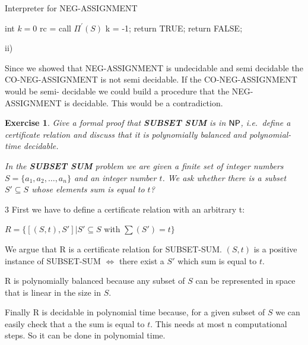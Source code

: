 \documentclass [11pt]{article}
\newtheorem{exercise}[theorem]{Exercise}
\newcommand{\ccfont}[1]{\protect\mathsf{#1}}
\newcommand{\NP}{\ccfont{NP}}
\newcommand{\solution}[1]{\noindent {\bf Solution.}  #1}
\begin{document}
\begin{algorithm}
\caption{Interpreter for NEG-ASSIGNMENT }
\label{intNEG}
\begin{algorithmic}

 \State int $k = 0$
 \State rc = call $\Pi^\prime(S)$
 \State k = -1;
  \State return TRUE;
 \Else
 \State return FALSE;
 \EndIf
\EndFunction

\end{algorithmic}
\end{algorithm}

\solution ii)

Since we showed that NEG-ASSIGNMENT is undecidable and semi decidable the CO-NEG-ASSIGNMENT is not semi decidable. If the CO-NEG-ASSIGNMENT would be semi- decidable we could build a procedure that the NEG-ASSIGNMENT is decidable. This would be a contradiction.

\begin{exercise}
  Give a formal proof that \textbf{SUBSET SUM} is in $\NP$, i.e.\, define a
  certificate relation and discuss that it is polynomially balanced and
  polynomial-time decidable.
  
   \smallskip
    
  \noindent In the \textbf{SUBSET SUM} problem we are given a finite set of integer numbers $S=\{a_1, a_2, \ldots, a_n\}$ and an integer number $t$. We ask whether there is a subset $S'\subseteq S$ whose elements sum is equal to $t$?
  
\end{exercise}


\solution{ 3}
   \smallskip
First we have to define a certificate relation with an arbitrary t:

\bigskip

$R = \{ [(S,t),S']|  S' \subseteq S $ with $ \sum(S') = t \} $ 

\bigskip
We argue that R is a certificate relation for SUBSET-SUM. $(S,t)$ is a positive instance of SUBSET-SUM $ \Leftrightarrow $ there exist a $S'$ which sum is equal to $t$.   

\bigskip

R is polynomially balanced because any subset of $S$ can be represented in space that is linear in the size in $S$.

\bigskip

Finally R is decidable in polynomial time because, for a given subset of $S$ we can easily check that a the sum is equal to $t$. This needs at most n computational steps. So it can be done in polynomial time.
\end{document}
